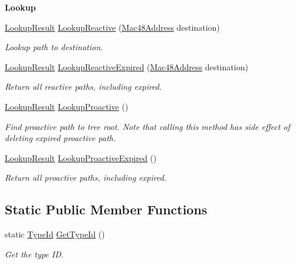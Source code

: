 \begin{Indent}{\bf Lookup}\par
\begin{DoxyCompactItemize}
\item 
\hyperlink{structns3_1_1dot11s_1_1HwmpRtable_1_1LookupResult}{Lookup\+Result} \hyperlink{classns3_1_1dot11s_1_1HwmpRtable_a41a44ed94c1ed4d798f3278ba8db0f1f}{Lookup\+Reactive} (\hyperlink{classns3_1_1Mac48Address}{Mac48\+Address} destination)
\begin{DoxyCompactList}\small\item\em Lookup path to destination. \end{DoxyCompactList}\item 
\hyperlink{structns3_1_1dot11s_1_1HwmpRtable_1_1LookupResult}{Lookup\+Result} \hyperlink{classns3_1_1dot11s_1_1HwmpRtable_a4c316ed97fff97b53cdb67c86eb3a0af}{Lookup\+Reactive\+Expired} (\hyperlink{classns3_1_1Mac48Address}{Mac48\+Address} destination)
\begin{DoxyCompactList}\small\item\em Return all reactive paths, including expired. \end{DoxyCompactList}\item 
\hyperlink{structns3_1_1dot11s_1_1HwmpRtable_1_1LookupResult}{Lookup\+Result} \hyperlink{classns3_1_1dot11s_1_1HwmpRtable_ad4bed27ab37ab1bc606802b763225a23}{Lookup\+Proactive} ()
\begin{DoxyCompactList}\small\item\em Find proactive path to tree root. Note that calling this method has side effect of deleting expired proactive path. \end{DoxyCompactList}\item 
\hyperlink{structns3_1_1dot11s_1_1HwmpRtable_1_1LookupResult}{Lookup\+Result} \hyperlink{classns3_1_1dot11s_1_1HwmpRtable_a8e40d22f24cb03d9d06f36484f29b805}{Lookup\+Proactive\+Expired} ()
\begin{DoxyCompactList}\small\item\em Return all proactive paths, including expired. \end{DoxyCompactList}\end{DoxyCompactItemize}
\end{Indent}
\subsection*{Static Public Member Functions}
\begin{DoxyCompactItemize}
\item 
static \hyperlink{classns3_1_1TypeId}{Type\+Id} \hyperlink{classns3_1_1dot11s_1_1HwmpRtable_a4c35e3c12fdf3257ff7b82ae5eaa7415}{Get\+Type\+Id} ()
\begin{DoxyCompactList}\small\item\em Get the type ID. \end{DoxyCompactList}\end{DoxyCompactItemize}
